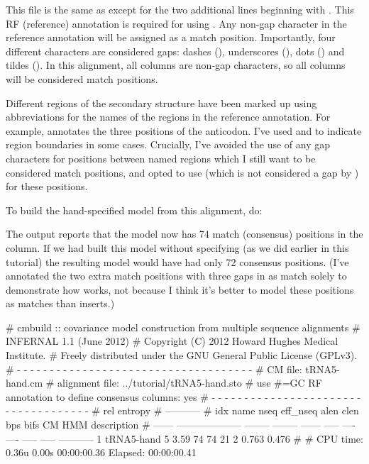 This file is the same as  except for the two
additional lines beginning with . This RF (reference)
annotation is required for using . Any non-gap character
in the reference annotation will be assigned as a match
position. Importantly, four different characters are considered gaps:
dashes (\otext{-}), underscores (\otext{\_}), dots () and
tildes (\otext{~}). In this alignment, all columns are non-gap
characters, so all columns will be considered match positions.

Different regions of the secondary structure have been marked up using
abbreviations for the names of the regions in the reference
annotation. For example,  annotates the three positions of
the anticodon. I've used \otext{[} and \otext{]} to indicate region
boundaries in some cases. Crucially, I've avoided the use of any gap
characters for positions between named regions which I still want to
be considered match positions, and opted to use \otext{=} (which is
not considered a gap by ) for these positions.

To build the hand-specified model from this alignment, do:


The output reports that the model now has 74 match (consensus)
positions in the  column. If we had built this model
without specifying  (as we did earlier in this tutorial)
the resulting model would have had only 72 consensus positions.
(I've annotated the two extra match positions with three gaps in
 as match solely to demonstrate how
 works, not because I think it's better to model these
positions as matches than inserts.)

\begin{sreoutput}
# cmbuild :: covariance model construction from multiple sequence alignments
# INFERNAL 1.1 (June 2012)
# Copyright (C) 2012 Howard Hughes Medical Institute.
# Freely distributed under the GNU General Public License (GPLv3).
# - - - - - - - - - - - - - - - - - - - - - - - - - - - - - - - - - - - -
# CM file:                                            tRNA5-hand.cm
# alignment file:                                     ../tutorial/tRNA5-hand.sto
# use #=GC RF annotation to define consensus columns: yes
# - - - - - - - - - - - - - - - - - - - - - - - - - - - - - - - - - - - -
#                                                                      rel entropy
#                                                                      -----------
# idx    name                     nseq eff_nseq   alen  clen  bps bifs    CM   HMM description
# ------ -------------------- -------- -------- ------ ----- ---- ---- ----- ----- -----------
       1 tRNA5-hand                  5     3.59     74    74   21    2 0.763 0.476 
#
# CPU time: 0.36u 0.00s 00:00:00.36 Elapsed: 00:00:00.41
\end{sreoutput}

